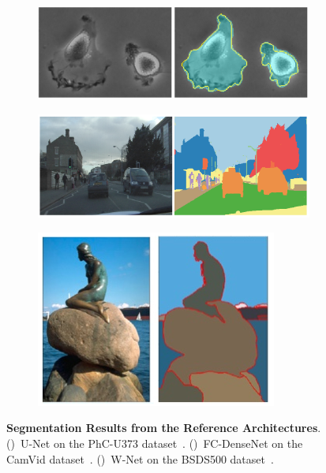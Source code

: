 \begin{figure}[b]
    \centering
    \hfill
    \begin{subfigure}{0.35\textwidth}
        \includegraphics[width=\textwidth]{images/segmentation_example_unet}
        \caption{}
        \label{fig:exseg_unet}
    \end{subfigure}
    \hfill
    \begin{subfigure}{0.35\textwidth}
        \includegraphics[width=\textwidth]{images/segmentation_example_densenet}
        \caption{}
        \label{fig:exseg_densenet}
    \end{subfigure}
    \hfill
    \begin{subfigure}{0.21\textwidth}
        \includegraphics[width=\textwidth]{images/segmentation_example_wnet}
        \caption{}
        \label{fig:exseg_wnet}
    \end{subfigure}
    \hfill
    \caption[Segmentation Results from the Reference Architectures]
    {\textbf{Segmentation Results from the Reference Architectures}. ()~U-Net on the PhC-U373 dataset~\cite{unet15}. ()~FC-DenseNet on the CamVid dataset~\cite{denseseg17}. ()~W-Net on the BSDS500 dataset~\cite{wnet17}.}
    \label{fig:segmentation_examples}
\end{figure}


